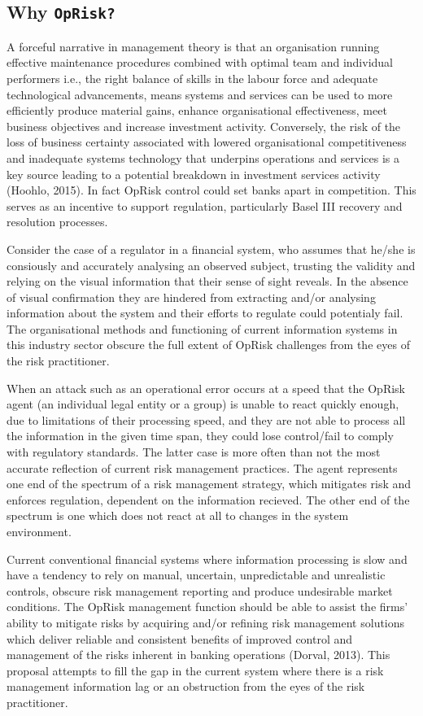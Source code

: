 \documentclass[]{DissertateUSU}
\begin{document}
\subsection{Why \texttt{OpRisk?}}

A forceful narrative in management theory is that an organisation
running effective maintenance procedures combined with optimal team and
individual performers i.e., the right balance of skills in the labour
force and adequate technological advancements, means systems and
services can be used to more efficiently produce material gains, enhance
organisational effectiveness, meet business objectives and increase
investment activity. Conversely, the risk of the loss of business
certainty associated with lowered organisational competitiveness and
inadequate systems technology that underpins operations and services is
a key source leading to a potential breakdown in investment services
activity (Hoohlo, 2015). In fact OpRisk control could set banks apart in
competition. This serves as an incentive to support regulation,
particularly Basel III recovery and resolution processes.\medskip

Consider the case of a regulator in a financial system, who assumes that
he/she is consiously and accurately analysing an observed subject,
trusting the validity and relying on the visual information that their
sense of sight reveals. In the absence of visual confirmation they are
hindered from extracting and/or analysing information about the system
and their efforts to regulate could potentialy fail. The organisational
methods and functioning of current information systems in this industry
sector obscure the full extent of OpRisk challenges from the eyes of the
risk practitioner.\medskip 

When an attack such as an operational error occurs at a speed that the
OpRisk agent (an individual legal entity or a group) is unable to react
quickly enough, due to limitations of their processing speed, and they
are not able to process all the information in the given time span, they
could lose control/fail to comply with regulatory standards. The latter
case is more often than not the most accurate reflection of current risk
management practices. The agent represents one end of the spectrum of a
risk management strategy, which mitigates risk and enforces regulation,
dependent on the information recieved. The other end of the spectrum is
one which does not react at all to changes in the system
environment.\medskip 

Current conventional financial systems where information processing is
slow and have a tendency to rely on manual, uncertain, unpredictable and
unrealistic controls, obscure risk management reporting and produce
undesirable market conditions. The OpRisk management function should be
able to assist the firms' ability to mitigate risks by acquiring and/or
refining risk management solutions which deliver reliable and consistent
benefits of improved control and management of the risks inherent in
banking operations (Dorval, 2013). This proposal attempts to fill the
gap in the current system where there is a risk management information
lag or an obstruction from the eyes of the risk practitioner.
\end{document}
